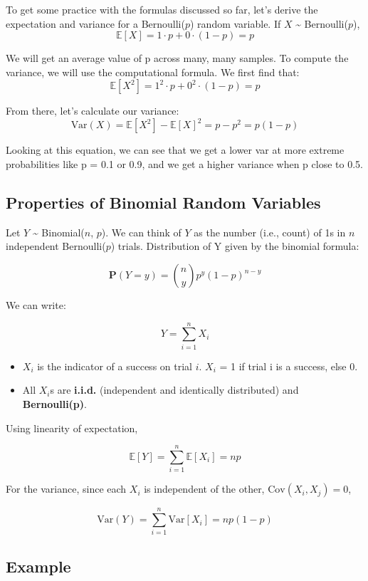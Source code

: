 \documentclass[
  letterpaper,
  DIV=11,
  numbers=noendperiod]{scrreprt}
\providecommand{\tightlist}{%
  \setlength{\itemsep}{0pt}\setlength{\parskip}{0pt}}\usepackage{longtable,booktabs,array}
\begin{document}
To get some practice with the formulas discussed so far, let's derive
the expectation and variance for a Bernoulli(\(p\)) random variable. If
\(X\) \textasciitilde{} Bernoulli(\(p\)),
\[\mathbb{E}[X] = 1 \cdot p + 0 \cdot (1 - p) = p\]

We will get an average value of p across many, many samples. To compute
the variance, we will use the computational formula. We first find that:
\[\mathbb{E}[X^2] = 1^2 \cdot p + 0^2 \cdot (1 - p) = p\]

From there, let's calculate our variance:
\[\text{Var}(X) = \mathbb{E}[X^2] - \mathbb{E}[X]^2 = p - p^2 = p(1-p)\]

Looking at this equation, we can see that we get a lower var at more
extreme probabilities like p = 0.1 or 0.9, and we get a higher variance
when p close to 0.5.

\subsection{Properties of Binomial Random
Variables}\label{properties-of-binomial-random-variables}

Let \(Y\) \textasciitilde{} Binomial(\(n\), \(p\)). We can think of
\(Y\) as the number (i.e., count) of 1s in \(n\) independent
Bernoulli(\(p\)) trials. Distribution of Y given by the binomial
formula:

\[ \textbf{P}(Y=y) = \binom{n}{y} p^y (1-p)^{n-y}\]

We can write:

\[Y = \sum_{i=1}^n X_i\]

\begin{itemize}
\tightlist
\item
  \(X_i\) is the indicator of a success on trial \(i\). \(X_i\) = 1 if
  trial i is a success, else 0.
\item
  All \(X_i\)s are \textbf{i.i.d.} (independent and identically
  distributed) and \textbf{Bernoulli(p)}.
\end{itemize}

Using linearity of expectation,

\[\mathbb{E}[Y] = \sum_{i=1}^n \mathbb{E}[X_i] = np\]

For the variance, since each \(X_i\) is independent of the other,
\(\text{Cov}(X_i, X_j) = 0\),

\[\text{Var}(Y) =  \sum_{i=1}^n \text{Var}[X_i] = np(1-p)\]

\subsection{Example}\label{example}
\end{document}
